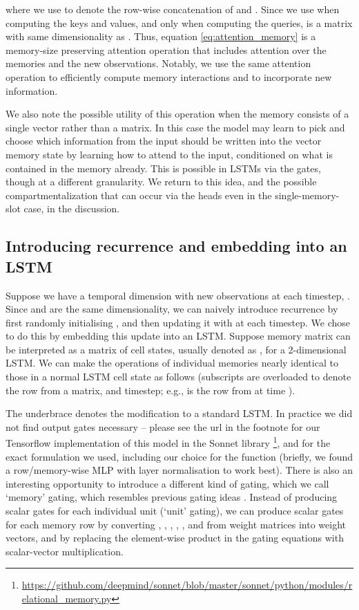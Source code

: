 \documentclass{article}
\begin{document}
where we use  to denote the row-wise concatenation of  and . Since we use  when computing the keys and values, and only  when computing the queries,  is a matrix with same dimensionality as . Thus, equation \ref{eq:attention_memory} is a memory-size preserving attention operation that includes attention over the memories and the new observations. Notably, we use the same attention operation to efficiently compute memory interactions and to incorporate new information. 

We also note the possible utility of this operation when the memory consists of a single vector rather than a matrix. In this case the model may learn to pick and choose which information from the input should be written into the vector memory state by learning how to attend to the input, conditioned on what is contained in the memory already. This is possible in LSTMs via the gates, though at a different granularity. We return to this idea, and the possible compartmentalization that can occur via the heads even in the single-memory-slot case, in the discussion. 

\subsection{Introducing recurrence and embedding into an LSTM}
Suppose we have a temporal dimension with new observations at each timestep, . Since  and  are the same dimensionality, we can naively introduce recurrence by first randomly initialising , and then updating it with  at each timestep. We chose to do this by embedding this update into an LSTM. Suppose memory matrix  can be interpreted as a matrix of cell states, usually denoted as , for a 2-dimensional LSTM. We can make the operations of individual memories  nearly identical to those in a normal LSTM cell state as follows (subscripts are overloaded to denote the row from a matrix, and timestep; e.g.,  is the  row from  at time ).


The underbrace denotes the modification to a standard LSTM. In practice we did not find output gates necessary -- please see the url in the footnote for our Tensorflow implementation of this model in the Sonnet library \footnote{\url{https://github.com/deepmind/sonnet/blob/master/sonnet/python/modules/relational_memory.py}}, and for the exact formulation we used, including our choice for the  function (briefly, we found a row/memory-wise MLP with layer normalisation to work best). There is also an interesting opportunity to introduce a different kind of gating, which we call `memory' gating, which resembles previous gating ideas \cite{gers1999learning, hochreiter1998lstm}. Instead of producing scalar gates for each individual unit (`unit' gating), we can produce scalar gates for each memory row by converting , , , , , and  from weight matrices into weight vectors, and by replacing the element-wise product in the gating equations with scalar-vector multiplication. 
\end{document}
